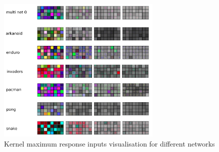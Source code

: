 \documentclass[10pt,a4paper]{article}
\begin{document}
\begin{figure}[htb!]
\centering
\includegraphics[width=0.7\textwidth]{results/activity/kernel_features_desc.png}
\caption{Kernel maximum response inputs visualisation for different networks}\label{img:max_response}
\end{figure}


\iffalse
\end{document}
